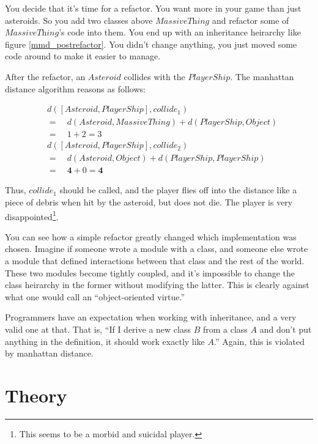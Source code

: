 \documentclass[12pt]{article}
\begin{document}
You decide that it's time for a refactor.  You want more in your game
than just asteroids.  So you add two classes above
$\textit{MassiveThing}$ and refactor some of $\textit{MassiveThing}$'s
code into them.  You end up with an inheritance heirarchy like figure
\vref{mmd_postrefactor}.  You didn't change anything, you just moved
some code around to make it easier to manage.

After the refactor, an $\mathit{Asteroid}$ collides with the
$\mathit{PlayerShip}$.  The manhattan distance algorithm reasons as
follows:

\begin{align*}
& d([\mathit{Asteroid},\mathit{PlayerShip}], \mathit{collide}_1) \\
& = \quad d(\mathit{Asteroid}, \mathit{MassiveThing}) + 
    d(\mathit{PlayerShip}, \mathit{Object}) \\
& = \quad 1 + 2 = 3 \\ 
& d([\mathit{Asteroid},\mathit{PlayerShip}], \mathit{collide}_2) \\
& = \quad d(\mathit{Asteroid}, \mathit{Object}) + 
    d(\mathit{PlayerShip}, \mathit{PlayerShip}) \\
& = \quad \mathbf{4} + 0 = \mathbf{4}
\end{align*}

Thus, $\mathit{collide}_1$ should be called, and the player flies off
into the distance like a piece of debris when hit by the asteroid, but
does not die.  The player is very disappointed\footnote{This seems to be
a morbid and suicidal player.}.

You can see how a simple refactor greatly changed which implementation
was chosen.  Imagine if someone wrote a module with a class, and someone
else wrote a module that defined interactions between that class and the
rest of the world.  These two modules become tightly coupled, and it's
impossible to change the class heirarchy in the former without modifying
the latter.  This is clearly against what one would call an
``object-oriented virtue.''

Programmers have an expectation when working with inheritance, and a
very valid one at that.  That is, ``If I derive a new class $B$ from a
class $A$ and don't put anything in the definition, it should work
exactly like $A$.''  Again, this is violated by manhattan distance.

\section{Theory}
\end{document}
